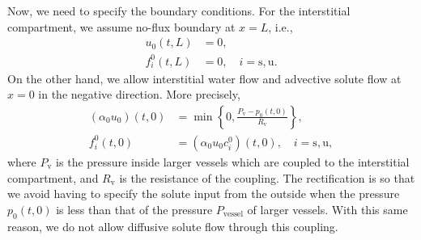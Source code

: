 \documentclass{article}
\begin{document}
Now, we need to specify the boundary conditions.
For the interstitial compartment, we assume no-flux boundary at $x=L$, i.e.,
\begin{align}
    u_0(t,L) &= 0,\\ 
    f_i^0(t,L)&=0,\quad i=\mathrm{s},\mathrm{u}.
\end{align}
On the other hand, we allow interstitial water flow and advective solute flow at $x=0$ in the negative direction.
More precisely,
\begin{align}
    (\alpha_0u_0)(t,0) &= \min\left\{ 0,\frac{P_{\mathrm{v}}-p_0(t,0) }{R_{\mathrm{v}}}\right\},\\ 
    f_i^0(t,0) &= (\alpha_0 u_0 c_i^0)(t,0),\quad i=\mathrm{s},\mathrm{u},
\end{align}
    where $P_{\mathrm{v}}$ is the pressure inside larger vessels which are coupled to the interstitial compartment, and $R_\mathrm{v}$ is the resistance of the coupling.
The rectification is so that we avoid having to specify the solute input from the outside when the pressure $p_0(t,0)$ is less than that of the pressure $P_\mathrm{vessel}$ of larger vessels.
With this same reason, we do not allow diffusive solute flow through this coupling.
\end{document}
